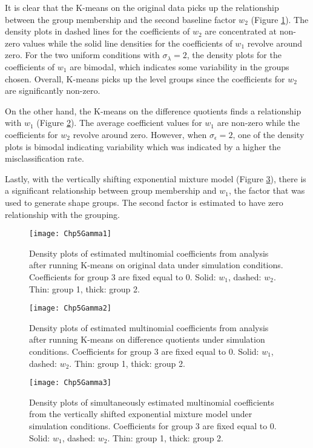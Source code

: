 It is clear that the K-means on the original data picks up the relationship between the group membership and the second baseline factor $w_{2}$ (Figure \ref{fig:gamma1}). The density plots in dashed lines for the coefficients of $w_{2}$ are concentrated at non-zero values while the solid line densities for the coefficients of $w_{1}$ revolve around zero. For the two uniform conditions with $\sigma_{\lambda}=2$, the density plots for the coefficients of $w_{1}$ are bimodal, which indicates some variability in the groups chosen. Overall, K-means picks up the level groups since the coefficients for $w_{2}$ are significantly non-zero.

On the other hand, the K-means on the difference quotients finds a relationship with $w_{1}$ (Figure \ref{fig:gamma2}). The average coefficient values for $w_{1}$ are non-zero while the coefficients for $w_{2}$ revolve around zero. However, when $\sigma_{\epsilon}=2$, one of the density plots is bimodal indicating variability which was indicated by a higher the misclassification rate.

Lastly, with the vertically shifting exponential mixture model (Figure \ref{fig:gamma3}), there is a significant relationship between group membership and $w_{1}$, the factor that was used to generate shape groups. The second factor is estimated to have zero relationship with the grouping.

\begin{landscape}
\begin{figure}[h]
\centering
\texttt{[image: Chp5Gamma1]}
\label{fig:gamma1}
\caption{Density plots of estimated multinomial coefficients from analysis after running K-means on original data under  simulation conditions. Coefficients for group 3 are fixed equal to 0. Solid: $w_{1}$, dashed: $w_{2}$. Thin: group 1, thick:  group 2.}
\end{figure}
\begin{figure}[h]
\centering
\texttt{[image: Chp5Gamma2]}
\label{fig:gamma2}
\caption{Density plots of estimated multinomial coefficients from analysis after running K-means on difference quotients under simulation conditions. Coefficients for group 3 are fixed equal to 0. Solid: $w_{1}$, dashed: $w_{2}$. Thin: group 1, thick:  group 2.}
\end{figure}
\begin{figure}[h]
\centering
\texttt{[image: Chp5Gamma3]}
\label{fig:gamma3}
\caption{Density plots of simultaneously estimated multinomial coefficients from the vertically shifted exponential mixture model under simulation conditions. Coefficients for group 3 are fixed equal to 0. Solid: $w_{1}$, dashed: $w_{2}$. Thin: group 1, thick:  group 2.}
\end{figure}
\end{landscape}

